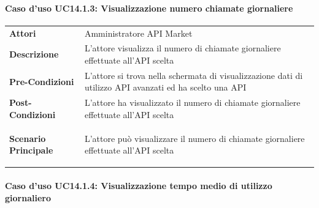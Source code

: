 \paragraph{Caso d'uso UC14.1.3: Visualizzazione numero chiamate giornaliere}
\label{UC14_1_3}

\begin{minipage}{\linewidth}
	\begin{tabular}{ l | p{11cm}}
		\hline
		\rowcolor{Gray}
		\multicolumn{2}{c}{UC14.1.3 - Visualizzazione numero chiamate giornaliere} \\
		\hline
		\textbf{Attori} & Amministratore API Market \\
		\textbf{Descrizione} & L'attore visualizza il numero di chiamate giornaliere effettuate all'API scelta \\
		\textbf{Pre-Condizioni} & L'attore si trova nella schermata di visualizzazione dati di utilizzo API avanzati ed ha scelto una API \\
		\textbf{Post-Condizioni} & L'attore ha visualizzato il numero di chiamate giornaliere effettuate all'API scelta \\
		\textbf{Scenario Principale} & 
		\begin{enumerate*}[label=(\arabic*.),itemjoin={\newline}]
			\item L'attore può visualizzare il numero di chiamate giornaliere effettuate all'API scelta
		\end{enumerate*}\\
	\end{tabular}
\end{minipage}

\paragraph{Caso d'uso UC14.1.4: Visualizzazione tempo medio di utilizzo giornaliero}
\label{UC14_1_4}

